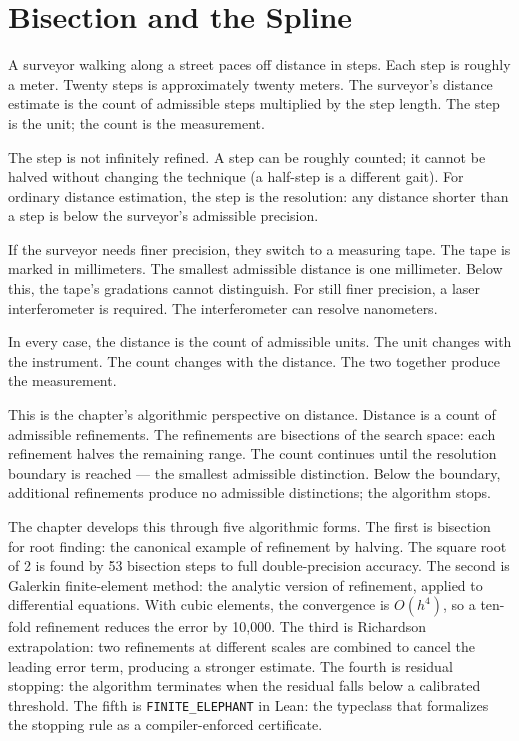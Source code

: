 \chapter{Bisection and the Spline}
\label{chap:bisection-and-the-spline}


\begin{chapteressay}

A surveyor walking along a street paces off distance in steps. Each step
is roughly a meter. Twenty steps is approximately twenty meters. The
surveyor's distance estimate is the count of admissible steps multiplied
by the step length. The step is the unit; the count is the measurement.

The step is not infinitely refined. A step can be roughly counted; it
cannot be halved without changing the technique (a half-step is a
different gait). For ordinary distance estimation, the step is the
resolution: any distance shorter than a step is below the surveyor's
admissible precision.

If the surveyor needs finer precision, they switch to a measuring tape.
The tape is marked in millimeters. The smallest admissible distance is
one millimeter. Below this, the tape's gradations cannot distinguish.
For still finer precision, a laser interferometer is required. The
interferometer can resolve nanometers.

In every case, the distance is the count of admissible units. The unit
changes with the instrument. The count changes with the distance. The
two together produce the measurement.

This is the chapter's algorithmic perspective on distance. Distance is
a count of admissible refinements. The refinements are bisections of
the search space: each refinement halves the remaining range. The count
continues until the resolution boundary is reached --- the smallest
admissible distinction. Below the boundary, additional refinements
produce no admissible distinctions; the algorithm stops.

The chapter develops this through five algorithmic forms. The first is
bisection for root finding: the canonical example of refinement by
halving. The square root of 2 is found by 53 bisection steps to full
double-precision accuracy. The second is Galerkin finite-element
method: the analytic version of refinement, applied to differential
equations. With cubic elements, the convergence is $O(h^4)$, so a
ten-fold refinement reduces the error by 10,000. The third is
Richardson extrapolation: two refinements at different scales are
combined to cancel the leading error term, producing a stronger
estimate. The fourth is residual stopping: the algorithm terminates
when the residual falls below a calibrated threshold. The fifth is
\texttt{FINITE\_ELEPHANT} in Lean: the typeclass that formalizes the
stopping rule as a compiler-enforced certificate.


\end{chapteressay}
